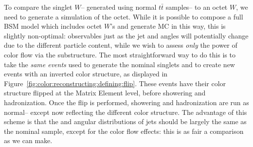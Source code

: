 To compare the singlet $W$-- generated using normal \PowPythia $t\bar{t}$ samples-- to an octet $W$, we need to generate a simulation of the octet. While it is possible to compose a full BSM model which includes octet $W$'s and generate MC in this way, this is slightly non-optimal: observables just as the jet \pt and angles will potentially change due to the different particle content, while we wish to assess \textit{only} the power of color flow via the substructure. The most straightforward way to do this is to take the \textit{same events} used to generate the nominal singlets and to create new events with an inverted color structure, as displayed in Figure~\ref{fig:color:reconstructing:defining:flip}. These events have their color structure flipped at the Matrix Element level, before showering and hadronization. Once the flip is performed, showering and hadronization are run as normal-- except now reflecting the different color structure. The advantage of this scheme is that the \pt and angular distributions of jets should be largely the same as the nominal sample, except for the color flow effects: this is as fair a comparison as we can make.


